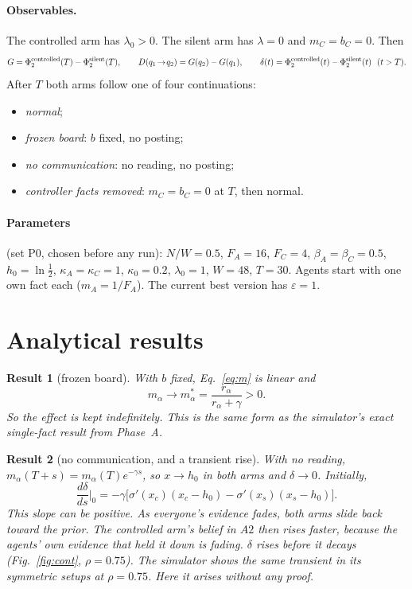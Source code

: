 \documentclass[10pt,a4paper]{article}
\newtheorem{result}{Result}
\begin{document}
\paragraph{Observables.} The controlled arm has $\lambda_0>0$. The silent arm has $\lambda=0$ and $m_C=b_C=0$. Then
\begin{equation}
G=\Phi_2^{\rm controlled}(T)-\Phi_2^{\rm silent}(T),\qquad D(q_1\!\to\!q_2)=G(q_2)-G(q_1),\qquad
\delta(t)=\Phi_2^{\rm controlled}(t)-\Phi_2^{\rm silent}(t)\ \ (t>T).\label{eq:obs}
\end{equation}
After $T$ both arms follow one of four continuations:
\begin{itemize}
\item \emph{normal};
\item \emph{frozen board}: $b$ fixed, no posting;
\item \emph{no communication}: no reading, no posting;
\item \emph{controller facts removed}: $m_C=b_C=0$ at $T$, then normal.
\end{itemize}

\paragraph{Parameters} (set P0, chosen before any run): $N/W=0.5$, $F_A=16$, $F_C=4$, $\beta_A=\beta_C=0.5$,
$h_0=\ln\tfrac12$, $\kappa_A=\kappa_C=1$, $\kappa_0=0.2$, $\lambda_0=1$, $W=48$, $T=30$. Agents start with one own fact
each ($m_A=1/F_A$). The current best version has $\varepsilon=1$.

\section{Analytical results}
\begin{result}[frozen board]
With $b$ fixed, Eq.~\eqref{eq:m} is linear and
\begin{equation}m_\alpha\to m_\alpha^*=\frac{r_\alpha}{r_\alpha+\gamma}>0.\label{eq:frozen}\end{equation}
So the effect is kept indefinitely. This is the same form as the simulator's exact single-fact result from Phase~A.
\end{result}

\begin{result}[no communication, and a transient rise]
With no reading, $m_\alpha(T+s)=m_\alpha(T)e^{-\gamma s}$, so $x\to h_0$ in both arms and $\delta\to0$. Initially,
\begin{equation}\frac{d\delta}{ds}\Big|_{0}=-\gamma\Big[\sigma'(x_c)(x_c-h_0)-\sigma'(x_s)(x_s-h_0)\Big].\label{eq:bump}\end{equation}
This slope can be \emph{positive}. As everyone's evidence fades, both arms slide back toward the prior. The controlled
arm's belief in $A2$ then rises faster, because the agents' own evidence that held it down is fading. $\delta$ rises
before it decays (Fig.~\ref{fig:cont}, $\rho=0.75$). The simulator shows the same transient in its symmetric setups at
$\rho=0.75$. Here it arises without any proof.
\end{result}
\end{document}

